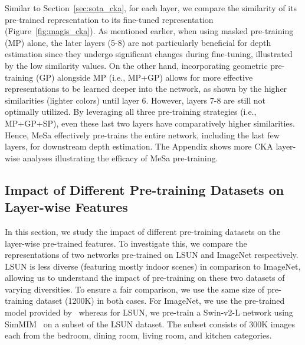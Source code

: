 Similar to Section~\ref{sec:sota_cka}, for each layer, we compare the similarity of its pre-trained representation to its fine-tuned representation (Figure~\ref{fig:magis_cka}). As mentioned earlier, when using masked pre-training (MP) alone, the later layers (5-8) are not particularly beneficial for depth estimation since they undergo significant changes during fine-tuning, illustrated by the low similarity values. On the other hand, incorporating geometric pre-training (GP) alongside MP (i.e., MP+GP) allows for more effective representations to be learned deeper into the network, as shown by the higher similarities (lighter colors) until layer 6. However, layers 7-8 are still not optimally utilized. By leveraging all three pre-training strategies (i.e., MP+GP+SP), even these last two layers have comparatively higher similarities. Hence, MeSa effectively pre-trains the entire network, including the last few layers, for downstream depth estimation. The Appendix shows more CKA layer-wise analyses illustrating the efficacy of MeSa pre-training.
\subsection{Impact of Different Pre-training Datasets on Layer-wise Features}
\label{sec:lsun_pretraining}
In this section, we study the impact of different pre-training datasets on the layer-wise pre-trained features. To investigate this, we compare the representations of two networks pre-trained on LSUN and ImageNet respectively. LSUN is less diverse (featuring mostly indoor scenes) in comparison to ImageNet, allowing us to understand the impact of pre-training on these two datasets of varying diversities. To ensure a fair comparison, we use the same size of pre-training dataset (1200K) in both cases. For ImageNet, we use the pre-trained model provided by~\citet{xie2022simmim,xie2022revealing} whereas for LSUN, we pre-train a Swin-v2-L network using SimMIM~\citep{xie2022simmim} on a subset of the LSUN dataset. The subset consists of 300K images each from the bedroom, dining room, living room, and kitchen categories.

